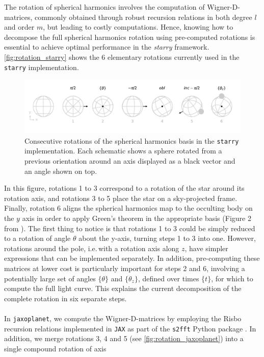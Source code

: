 \documentclass[modern]{aastex631}
\begin{document}
The rotation of spherical harmonics involves the computation of Wigner-D-matrices, commonly obtained through robust recursion relations in both degree $l$ and order $m$, but leading to costly computations. Hence, knowing how to decompose the full spherical harmonics rotation using pre-computed rotations is essential to achieve optimal performance in the \textit{starry} framework. \autoref{fig:rotation_starry} shows the 6 elementary rotations currently used in the \texttt{starry} implementation.
\begin{figure}[H]
    \begin{center}
        \includegraphics[width=\textwidth]{../workflows/rotations/figures/rotation_starry.pdf}
        \caption{Consecutive rotations of the spherical harmonics basis in the \texttt{starry} implementation. Each schematic shows a sphere rotated from a previous orientation around an axis displayed as a black vector and an angle shown on top.}
        \label{fig:rotation_starry}
    \end{center}
\end{figure}
In this figure, rotations 1 to 3 correspond to a rotation of the star around its rotation axis, and rotations 3 to 5 place the star on a sky-projected frame. Finally, rotation 6 aligns the spherical harmonics map to the occulting body on the $y$ axis in order to apply Green's theorem in the appropriate basis (Figure 2 from \citealt{starry}). The first thing to notice is that rotations 1 to 3 could be simply reduced to a rotation of angle $\theta$ about the y-axis, turning steps 1 to 3 into one. However, rotations around the pole, i.e.\,with a rotation axis along $z$, have simpler expressions that can be implemented separately. In addition, pre-computing these matrices at lower cost is particularly important for steps 2 and 6, involving a potentially large set of angles $\{\theta\}$ and $\{\theta_z\}$, defined over times $\{t\}$, for which to compute the full light curve. This explains the current decomposition of the complete rotation in six separate steps.\\\\
In \texttt{jaxoplanet}, we compute the Wigner-D-matrices by employing the Risbo recursion relations \citep{Risbo1996} implemented in \texttt{JAX} as part of the \texttt{s2fft} Python package \citep{price:s2fft}. In addition, we merge rotations 3, 4 and 5 (see \autoref{fig:rotation_jaxoplanet}) into a single compound rotation of axis
\end{document}
